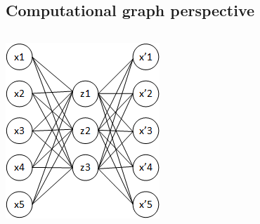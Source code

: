 \documentclass{Bredelebeamer}
\begin{document}
\subsection{Computational graph perspective}

\begin{frame}
	\begin{columns}
	\begin{column}{0.3\textwidth}
		\includegraphics[width=\textwidth]{autoencoder_bad_diagram.png}
	\end{column}
	\pause
	\begin{column}{0.33\textwidth}

\end{column}
\end{columns}
\end{frame}
\end{document}
